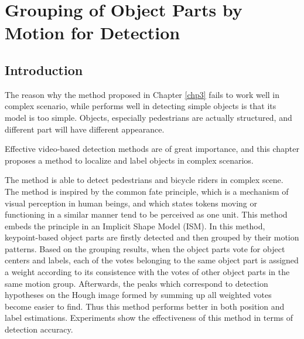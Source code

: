 \chapter{Grouping of Object Parts by Motion for Detection}
\label{chp4}
\section{Introduction}

The reason why the method proposed in  Chapter \ref{chp3} fails to work well in complex scenario, while performs well in detecting simple objects is that its model is too simple. Objects, especially pedestrians are actually structured, and different part will have different appearance.

Effective video-based detection methods are of great importance, and this chapter proposes a method to localize and label objects in complex scenarios.

The method is able to detect pedestrians and bicycle riders in complex scene. The method is inspired by the common fate principle, which is a mechanism of visual perception in human beings, and which states  tokens moving or functioning in a similar manner tend to be  perceived
as one unit. This method embeds the principle in an Implicit Shape Model (ISM). In this method, keypoint-based
object parts are firstly detected and then grouped by their motion patterns. Based on the grouping results, when the object parts vote for object centers and labels, each of the votes belonging to the same object part is assigned a weight according to its consistence with the votes of other object parts in the same motion group. Afterwards, the peaks which correspond to detection hypotheses on the Hough image formed by summing up all weighted votes become easier to find. Thus this method  performs better in both position and label estimations. Experiments show the effectiveness of this method in terms of detection accuracy.






